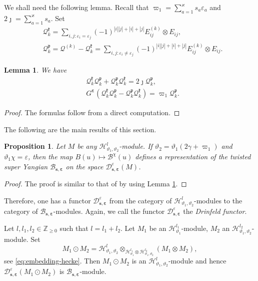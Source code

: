 \documentclass[11pt,reqno]{amsart}
\numberwithin{equation}{section}
\newtheorem{prop}[thm]{Proposition}
\newtheorem{lem}[thm]{Lemma}
\theoremstyle{definition}
\theoremstyle{remark}
\newcommand{\mc}{\mathcal}
\newcommand{\bZ}{\mathbb{Z}}
\newcommand{\gge}{\geqslant}
\newcommand{\BMN}{{\mathscr{B}_{\bm s,\bm \ve}}}
\newcommand{\ka}{\varkappa}
\newcommand{\ve}{\varepsilon}
\newcommand{\s}{{\bm s}}
\begin{document}
We shall need the following lemma. Recall that $\varpi_1=\sum_{a=1}^\ka s_a\ve_a$ and $2\jmath=\sum_{a=1}^\ka s_a$. Set
\begin{align*}
&\mathcal Q_k^{\mathfrak k}=\sum_{i,j:\ve_i=\ve_j}(-1)^{|i||j|+|i|+|j|}E_{ij}^{(k)}\otimes E_{ij},\\
&\mathcal Q_k^{\mathfrak p}=\mathcal Q^{(k)}-\mathcal Q_k^{\mathfrak k}=\sum_{i,j:\ve_i\ne\ve_j}(-1)^{|i||j|+|i|+|j|}E_{ij}^{(k)}\otimes E_{ij}.
\end{align*}
\begin{lem}\label{lem:cgm-thm4.5}
We have
\begin{align*}
&\mathcal Q_k^{\mathfrak k}\mathcal Q_k^{\mathfrak p}+\mathcal Q_k^{\mathfrak p}\mathcal Q_k^{\mathfrak k}=2\jmath \mathcal Q_k^{\mathfrak p},\\
&G^{\bm\ve}(\mathcal Q_k^{\mathfrak k}\mathcal Q_k^{\mathfrak p}-\mathcal Q_k^{\mathfrak p}\mathcal Q_k^{\mathfrak k})=\varpi_1 \mathcal Q_k^{\mathfrak p}.
\end{align*}
\end{lem}
\begin{proof}
The formulas follow from a direct computation.
\end{proof}

The following are the main results of this section.

\begin{prop}\label{prop:Drinfeld-functor-BC}
Let $M$ be any $\mathscr H_{\vartheta_1,\vartheta_2}^l$-module. If $\vartheta_2=\vartheta_1(2\gamma +\varpi_1)$ and $\vartheta_1\chi=\ve$, then the map $B(u)\mapsto \mc B^\chi(u)$ defines a representation of the twisted super Yangian $\BMN$ on the space $\mc D_{\s,\bm \ve}^{\ve}(M)$.
\end{prop}
\begin{proof}
The proof is similar to that of \cite[Theorem 4.5]{Chen2014twisted} by using Lemma \ref{lem:cgm-thm4.5}.
\end{proof}

Therefore, one has a functor $\mc D_{\s,\bm\ve}^\ve$ from the category of $\mathscr H_{\vartheta_1,\vartheta_2}^l$-modules to the category of $\BMN$-modules. Again, we call the functor $\mc D_{\s,\bm\ve}^\ve$ the {\it Drinfeld functor}.

Let $l,l_1,l_2\in\bZ_{\gge0}$ such that $l=l_1+l_2$. Let $M_1$ be an $\mathscr H_{\vartheta_1}^{l_1}$-module, $M_2$ an $\mathscr H_{\vartheta_1,\vartheta_2}^{l_2}$-module. Set
\[
M_1\odot M_2 =\mathscr H_{\vartheta_1,\vartheta_2}^{l}\otimes_{\mathscr H_{\vartheta_1}^{l_1} \otimes \mathscr H_{\vartheta_1,\vartheta_2}^{l_2} }(M_1\otimes M_2),
\]
see \eqref{eq:embedding-hecke}. Then $M_1\odot M_2$ is an $\mathscr H_{\vartheta_1,\vartheta_2}^{l}$-module and hence $\mc D_{\s,\bm \ve}^\ve(M_1\odot M_2)$ is $\BMN$-module.
\end{document}
